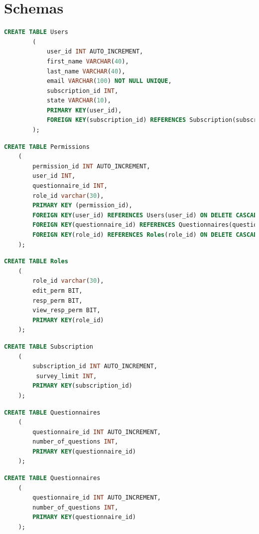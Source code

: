 \documentclass[12pt, oneside]{article}
\begin{document}
    \section{Schemas}
    \begin{lstlisting}[language=SQL, columns=flexible, breaklines]
        CREATE TABLE Users
        (
            user_id INT AUTO_INCREMENT,
            first_name VARCHAR(40),
            last_name VARCHAR(40),
            email VARCHAR(100) NOT NULL UNIQUE,
            subscription_id INT,
            state VARCHAR(10),
            PRIMARY KEY(user_id),
            FOREIGN KEY(subscription_id) REFERENCES Subscription(subscription_id) ON DELETE CASCADE
        );
    \end{lstlisting}
    \begin{lstlisting}[language=SQL, columns=flexible, breaklines]
    CREATE TABLE Permissions
    (
        permission_id INT AUTO_INCREMENT,
        user_id INT,
        questionnaire_id INT,
        role_id varchar(30),
        PRIMARY KEY (permission_id),
        FOREIGN KEY(user_id) REFERENCES Users(user_id) ON DELETE CASCADE,
        FOREIGN KEY(questionnaire_id) REFERENCES Questionnaires(questionnaire_id) ON DELETE CASCADE,
        FOREIGN KEY(role_id) REFERENCES Roles(role_id) ON DELETE CASCADE
    );
    \end{lstlisting}
    \begin{lstlisting}[language=SQL, columns=flexible, breaklines]
    CREATE TABLE Roles
    (
        role_id varchar(30),
        edit_perm BIT,
        resp_perm BIT,
        view_resp_perm BIT,
        PRIMARY KEY(role_id)
    );
    \end{lstlisting}
    \begin{lstlisting}[language=SQL, columns=flexible, breaklines]
    CREATE TABLE Subscription
    (
        subscription_id INT AUTO_INCREMENT,
         survey_limit INT,
        PRIMARY KEY(subscription_id)
    );
    \end{lstlisting}
    \begin{lstlisting}[language=SQL, columns=flexible, breaklines]
    CREATE TABLE Questionnaires
    (
        questionnaire_id INT AUTO_INCREMENT,
        number_of_questions INT,
        PRIMARY KEY(questionnaire_id)
    );
    \end{lstlisting}
    \begin{lstlisting}[language=SQL, columns=flexible, breaklines]
    CREATE TABLE Questionnaires
    (
        questionnaire_id INT AUTO_INCREMENT,
        number_of_questions INT,
        PRIMARY KEY(questionnaire_id)
    );
    \end{lstlisting}
\end{document}
